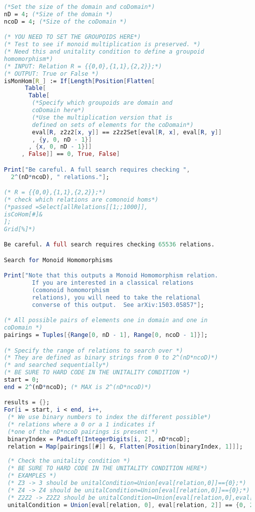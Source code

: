 \begin{lstlisting}[language=Mathematica]
(*Set the size of the domain and coDomain*)
nD = 4; (*Size of the domain *)
ncoD = 4; (*Size of the coDomain *)

(* YOU NEED TO SET THE GROUPOIDS HERE*)
(* Test to see if monoid multiplication is preserved. *)
(* Need this and unitality condition to define a groupoid 
homomorphism*)
(* INPUT: Relation R = {{0,0},{1,1},{2,2}};*)
(* OUTPUT: True or False *)
isMonHom[R_] := If[Length[Position[Flatten[
      Table[
       Table[
        (*Specify which groupoids are domain and 
        coDomain here*)
        (*Use the multiplication version that is 
        defined on sets of elements for the coDomain*)
        eval[R, z2z2[x, y]] == z2z2Set[eval[R, x], eval[R, y]]
        , {y, 0, nD - 1}]
       , {x, 0, nD - 1}]]
     , False]] == 0, True, False]

Print["Be careful. A full search requires checking ",
  2^(nD*ncoD), " relations."];

(* R = {{0,0},{1,1},{2,2}};*)
(* check which relations are comonoid homs*)
(*passed =Select[allRelations[[1;;1000]],
isCoHom[#]&
];
Grid[%]*)

Be careful. A full search requires checking 65536 relations.

Search for Monoid Homomorphisms

Print["Note that this outputs a Monoid Homomorphism relation.
        If you are interested in a classical relations 
        (comonoid homomorphism 
        relations), you will need to take the relational 
        converse of this output.  See arXiv:1503.05857"];

(* All possible pairs of elements one in domain and one in
coDomain *)
pairings = Tuples[{Range[0, nD - 1], Range[0, ncoD - 1]}];

(* Specify the range of relations to search over *)
(* They are defined as binary strings from 0 to 2^(nD*ncoD)*)
(* and searched sequentially*)
(* BE SURE TO HARD CODE IN THE UNITALITY CONDITION *)
start = 0;
end = 2^(nD*ncoD); (* MAX is 2^(nD*ncoD)*)

results = {};
For[i = start, i < end, i++,
 (* We use binary numbers to index the different possible*)
 (* relations where a 0 or a 1 indicates if 
 (*one of the nD*ncoD pairings is present *)
 binaryIndex = PadLeft[IntegerDigits[i, 2], nD*ncoD];
 relation = Map[pairings[[#]] &, Flatten[Position[binaryIndex, 1]]];
 
 (* Check the unitality condition *)
 (* BE SURE TO HARD CODE IN THE UNITALITY CONDITION HERE*)
 (* EXAMPLES *)
 (* Z3 -> 3 should be unitalCondition=Union[eval[relation,0]]=={0};*)
 (* Z4 -> Z4 should be unitalCondition=Union[eval[relation,0]]=={0};*)
 (* Z2Z2 -> Z2Z2 should be unitalCondition=Union[eval[relation,0],eval[relation,2]]=={0,2}; *)
 unitalCondition = Union[eval[relation, 0], eval[relation, 2]] == {0, 2};
 

\end{lstlisting}
